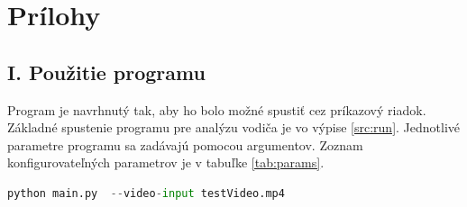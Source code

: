 \documentclass[slovak,master,dept460,male,cpp,cpdeclaration]{diploma}
\begin{document}



\newpage
\section*{Prílohy}
\label{Prílohy}
\subsection*{I. Použitie programu}
Program je navrhnutý tak, aby ho bolo možné spustiť cez príkazový riadok. Základné spustenie programu pre analýzu vodiča je vo  výpise \ref{src:run}. Jednotlivé parametre programu sa zadávajú pomocou argumentov. Zoznam konfigurovateľných parametrov je v tabuľke \ref{tab:params}.

\begin{lstlisting}[language=Python,label=src:run,caption={Spustenie programu}]
   python main.py  --video-input testVideo.mp4
\end{lstlisting}
\end{document}
